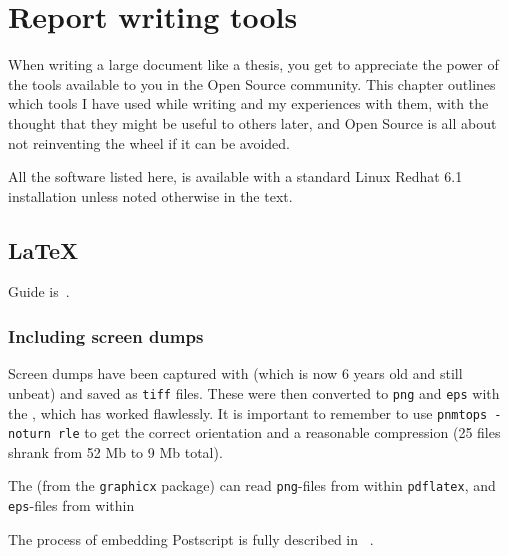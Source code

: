 
\chapter{Report writing tools}

When writing a large document like a thesis, you get to appreciate the
power of the tools available to you in the Open Source community.
This chapter outlines which tools I have used while writing and my
experiences with them, with the thought that they might be useful to
others later, and Open Source is all about not reinventing the wheel
if it can be avoided.

All the software listed here, is available with a standard Linux
Redhat 6.1 installation unless noted otherwise in the text.


\section{\LaTeX}
\label{sec:report-writing-tools-latex}


Guide is~\cite{a-guide-to-latex}.



\subsection{Including screen dumps}
\label{sec:report-writing-tools-latex-eps}

Screen dumps have been captured with
(which is now 6 years old and still unbeat) and saved as \texttt{tiff}
files.  These were then converted to \texttt{png} and \texttt{eps}
with the
, which has worked flawlessly.  It is important to remember
to use \texttt{pnmtops -noturn rle} to get the correct orientation and
a reasonable compression (25 files shrank from 52 Mb to 9 Mb total).

The  (from the \texttt{graphicx} package)
can read \texttt{png}-files from within \texttt{pdflatex}, and
\texttt{eps}-files from within


The process of embedding Postscript is fully described in
~\cite{the-latex-graphics-companion}.


